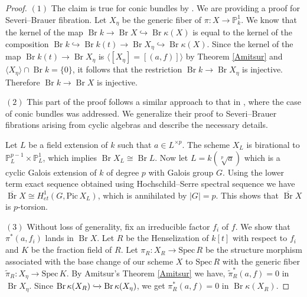 \documentclass[11pt]{amsart}
\theoremstyle{plain}
\theoremstyle{definition}
\DeclareMathOperator{\Br}{Br}
\begin{document}
	\begin{proof}
		$(1)$ The claim is true for conic bundles by \cite[Lemma 11.3.3]{BG}. We are providing a proof for Severi--Brauer fibration. Let $X_{\eta}$ be the generic fiber of \( \pi: X \to \mathbb{P}^1_k \). We know that the kernel of the map \( \Br k \rightarrow \Br X \hookrightarrow \Br \kappa(X) \) is equal to the kernel of the composition \( \Br k \hookrightarrow \Br k(t) \rightarrow \Br X_{\eta} \hookrightarrow \Br \kappa(X) \). Since the kernel of the map \( \Br k(t) \to \Br X_{\eta} \) is \( \langle [X_{\eta}] = [(a,f)] \rangle \)  by Theorem \ref{Amitsur} and \( \langle X_{\eta} \rangle \cap \Br k = \{0\} \), it follows that the restriction \( \Br k \to \Br X_{\eta} \) is injective. Therefore $\Br k \to \Br X$ is injective.
		
		$(2)$ This part of the proof follows a similar approach to that in \cite[Theorem 6.5.(a)]{berg}, where the case of conic bundles was addressed. We generalize their proof to Severi--Brauer fibrations arising from cyclic algebras and describe the necessary details.
		
		Let $L$ be a field extension of $k$ such that $a \in L^{\times p}$. The scheme $X_L$ is birational to \( \mathbb{P}^{p-1}_L \times \mathbb{P}^1_L \), which implies \( \Br X_L \cong \Br L \). Now let  $L=k(\sqrt[p]a)$ which is a cyclic Galois extension of \( k \) of degree \( p \) with Galois group $G$. Using the lower term exact sequence obtained using Hochschild–Serre spectral sequence we have $\overline{\Br}X \cong H^1_{et}(G, \text{Pic}\, X_L)$, which is annihilated by \(|G| = p\). This shows that \(\overline{\Br}X\) is \(p\)-torsion.

        
        $(3)$ Without loss of generality, fix an irreducible factor $f_i$ of $f$. We show that $\pi^{*}(a, f_i)$ lands in $\Br X$. Let $R$ be the Henselization of $k[t]$ with respect to  $f_i$ and $K$ be the fraction field of $R$. Let \( \pi_R: X_R \rightarrow \text{Spec}\,R \) be the structure morphism associated with the base change of our scheme $X$ to $\text{Spec}\,R$ with the generic fiber \( \tilde{\pi}_R: X_{\eta} \rightarrow \text{Spec}\, K \). By Amitsur's Theorem \ref{Amitsur} we have,  $\tilde{\pi}_R^{*}(a,f)=0$ in $\Br X_{\eta}$. Since $\Br \kappa(X_R)\xhookrightarrow{}\Br \kappa(X_{\eta})$, we get $\pi_R^{*}(a,f)=0$ in $\Br \kappa(X_{R})$. 
	

\end{proof}
\end{document}
